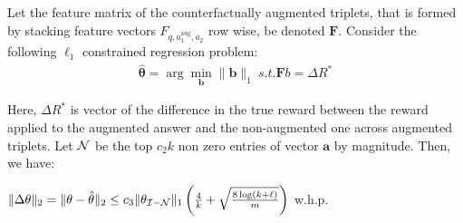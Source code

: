\begin{theorem}
\label{thm:appendix_lasso_recovery}
  Let the feature matrix of the counterfactually augmented triplets, that is formed by stacking feature vectors $F_{q,a^\mathrm{aug}_1,a_2}$ row wise, be denoted $\mathbf{F}$. Consider the following $\ell_1$ constrained regression problem:
  \begin{align}
   \hat{\mathbf{\theta}} = \arg \min \limits_{\mathbf{b}} \lVert \mathbf{b} \rVert_1~s.t. \mathbf{F}b = \Delta R^{*}
  \end{align}    

Here, $\Delta R^{*}$ is vector of the difference in the true reward between the reward applied to the augmented answer and the non-augmented one across augmented triplets. Let ${\cal N}$ be the top $c_2 k$ non zero entries of vector $\mathbf{a}$ by magnitude. Then, we have:

 $\lVert \Delta \mathbf{\theta} \rVert_2  = \lVert \mathbf{\theta} - \hat{\mathbf{\theta}} \rVert_2 \leq c_3 \lVert \theta_{{\cal I}-{\cal N}} \rVert_1 \left( \frac{4}{k} +  \sqrt{\frac{8 \log(k+\ell)}{m}} \right)  $ w.h.p.
\end{theorem}


